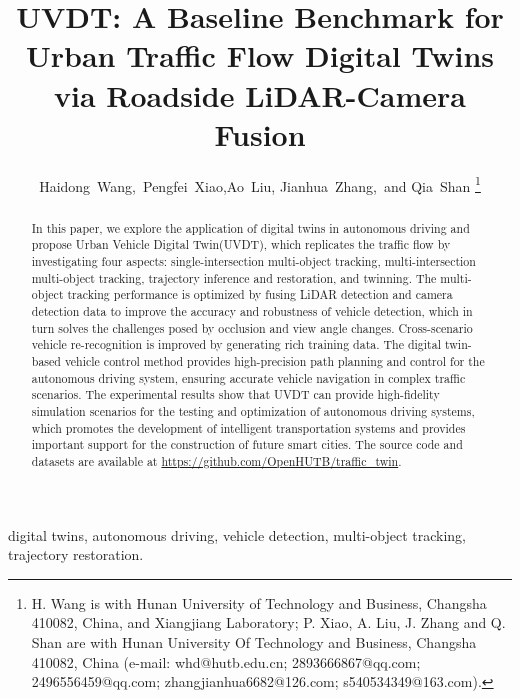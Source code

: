 \documentclass[journal,twoside,web]{ieeecolor}
\begin{document}
\title{UVDT: A Baseline Benchmark for Urban Traffic Flow Digital Twins via Roadside LiDAR-Camera Fusion}
\author{Haidong~Wang,~Pengfei~Xiao,Ao~Liu, Jianhua~Zhang,~and Qia~Shan
\thanks{H. Wang is with Hunan University of Technology and Business, Changsha 410082, China, and Xiangjiang Laboratory; P. Xiao, A. Liu, J. Zhang and Q. Shan are with Hunan University Of Technology and Business, Changsha 410082, China (e-mail: whd@hutb.edu.cn; 2893666867@qq.com; 2496556459@qq.com; zhangjianhua6682@126.com; s540534349@163.com).}}

\maketitle

\begin{abstract}
In this paper, we explore the application of digital twins in autonomous driving and propose Urban Vehicle Digital Twin(UVDT), which replicates the traffic flow by investigating four aspects: single-intersection multi-object tracking, multi-intersection multi-object tracking, trajectory inference and restoration, and twinning. 
The multi-object tracking performance is optimized by fusing LiDAR detection and camera detection data to improve the accuracy and robustness of vehicle detection, which in turn solves the challenges posed by occlusion and view angle changes. 
Cross-scenario vehicle re-recognition is improved by generating rich training data. 
The digital twin-based vehicle control method provides high-precision path planning and control for the autonomous driving system, ensuring accurate vehicle navigation in complex traffic scenarios. 
The experimental results show that UVDT can provide high-fidelity simulation scenarios for the testing and optimization of autonomous driving systems, which promotes the development of intelligent transportation systems and provides important support for the construction of future smart cities.
The source code and datasets are available at \underline 
{https://github.com/OpenHUTB/traffic\_twin}.
\end{abstract}

\begin{IEEEkeywords}
digital twins, autonomous driving, vehicle detection, multi-object tracking, trajectory restoration.
\end{IEEEkeywords}
\end{document}
